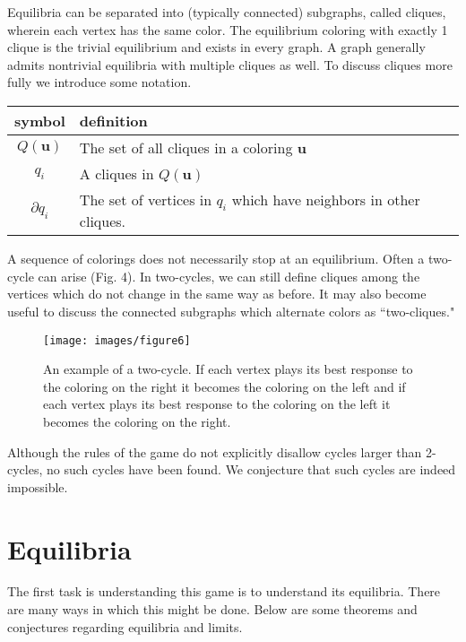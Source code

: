\documentclass[]{article}
\begin{document}
Equilibria can be separated into (typically connected) subgraphs,  called cliques, wherein each vertex has the same color. The equilibrium coloring with exactly 1 clique is the trivial equilibrium and exists in every graph. A graph generally admits nontrivial equilibria with multiple cliques as well. To discuss cliques more fully we introduce some notation.
\begin{center}
	\begin{tabular}{c|l}
		symbol&definition\\
		\hline
		$Q(\mathbf{u})$& The set of all cliques in a coloring $\mathbf{u}$\\
		$q_i$& A cliques in $Q(\mathbf{u})$\\
		$\partial q_i$ &The set of vertices in $q_i$ which have neighbors in other cliques. 	
	\end{tabular}
\end{center}

 A sequence of colorings does not necessarily stop at an equilibrium. Often a two-cycle can arise (Fig. 4). In two-cycles, we can still define cliques among the vertices which do not change in the same way as before. It may also become useful to discuss the connected subgraphs which alternate colors as ``two-cliques."

\begin{figure}[]
	\texttt{[image: images/figure6]}
	\caption{An example of a two-cycle. If each vertex plays its best response to the coloring on the right it becomes the coloring on the left and if each vertex plays its best response to the coloring on the left it becomes the coloring on the right. }
\end{figure}

Although the rules of the game do not explicitly disallow cycles larger than 2-cycles, no such cycles have been found. We conjecture that such cycles are indeed impossible.  

\section{Equilibria}
The first task is understanding this game is to understand its equilibria. There are many ways in which this might be done. Below are some theorems and conjectures regarding equilibria and limits. 
\end{document}
